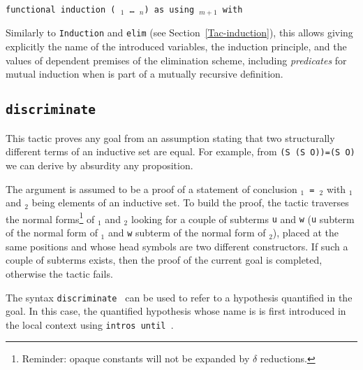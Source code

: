 \begin{coq_example*}
\begin{ErrMsgs}
\item {}
\item {}
\end{ErrMsgs}

\begin{Variants}
\item {\tt functional induction (\qualid\ \term$_1$ \dots\ \term$_n$)
  as {\disjconjintropattern} using \term$_{m+1}$ with \bindinglist}

 Similarly to \texttt{Induction} and \texttt{elim}
 (see Section~\ref{Tac-induction}), this allows giving explicitly the
 name of the introduced variables, the
 induction principle, and the values of dependent premises of the
 elimination scheme, including \emph{predicates} for mutual induction
 when {\qualid} is part of a mutually recursive definition.

\end{Variants}

\subsection{\tt discriminate \term}
\label{discriminate}


This tactic proves any goal from an assumption stating that two
structurally different terms of an inductive set are equal. For
example, from {\tt (S (S O))=(S O)} we can derive by absurdity any
proposition.

The argument {\term} is assumed to be a proof of a statement
of conclusion {\tt{\term$_1$} = {\term$_2$}} with {\term$_1$} and
{\term$_2$} being elements of an inductive set.  To build the proof,
the tactic traverses the normal forms\footnote{Reminder: opaque
  constants will not be expanded by $\delta$ reductions.} of
{\term$_1$} and {\term$_2$} looking for a couple of subterms {\tt u}
and {\tt w} ({\tt u} subterm of the normal form of {\term$_1$} and
{\tt w} subterm of the normal form of {\term$_2$}), placed at the same
positions and whose head symbols are two different constructors. If
such a couple of subterms exists, then the proof of the current goal
is completed, otherwise the tactic fails.

\Rem The syntax {\tt discriminate {\ident}} can be used to refer to a
hypothesis quantified in the goal. In this case, the quantified
hypothesis whose name is {\ident} is first introduced in the local
context using \texttt{intros until \ident}.


\end{coq_example*}
